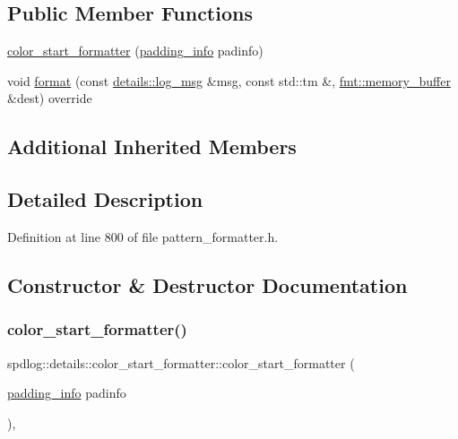 \subsection*{Public Member Functions}
\begin{DoxyCompactItemize}
\item 
\hyperlink{classspdlog_1_1details_1_1color__start__formatter_a5222b004ac21f1b4db466400a324ad21}{color\+\_\+start\+\_\+formatter} (\hyperlink{structspdlog_1_1details_1_1padding__info}{padding\+\_\+info} padinfo)
\item 
void \hyperlink{classspdlog_1_1details_1_1color__start__formatter_af91a839656b9128edbc7f0d6ea297d3f}{format} (const \hyperlink{structspdlog_1_1details_1_1log__msg}{details\+::log\+\_\+msg} \&msg, const std\+::tm \&, \hyperlink{format_8h_a21cbf729f69302f578e6db21c5e9e0d2}{fmt\+::memory\+\_\+buffer} \&dest) override
\end{DoxyCompactItemize}
\subsection*{Additional Inherited Members}


\subsection{Detailed Description}


Definition at line 800 of file pattern\+\_\+formatter.\+h.



\subsection{Constructor \& Destructor Documentation}
\mbox{\label{classspdlog_1_1details_1_1color__start__formatter_a5222b004ac21f1b4db466400a324ad21}} 
\subsubsection{\texorpdfstring{color\+\_\+start\+\_\+formatter()}{color\_start\_formatter()}}
{\footnotesize\ttfamily spdlog\+::details\+::color\+\_\+start\+\_\+formatter\+::color\+\_\+start\+\_\+formatter (\begin{DoxyParamCaption}\item[{\hyperlink{structspdlog_1_1details_1_1padding__info}{padding\+\_\+info}}]{padinfo }\end{DoxyParamCaption})\hspace{0.3cm}{\ttfamily [inline]}, {\ttfamily [explicit]}}



